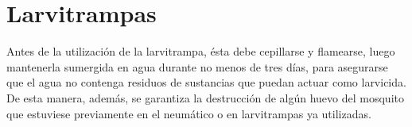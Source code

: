 \section{Larvitrampas}
\label{sec:densidad-vectorial-larvitrampas}
Antes de la utilización de la larvitrampa, ésta debe cepillarse y flamearse,
luego mantenerla sumergida en agua durante no menos de tres días, para
asegurarse que el agua no contenga residuos de sustancias que puedan actuar
como larvicida. De esta manera, además, se garantiza la destrucción de
algún huevo del mosquito que estuviese previamente en el neumático o en
larvitrampas ya utilizadas.
